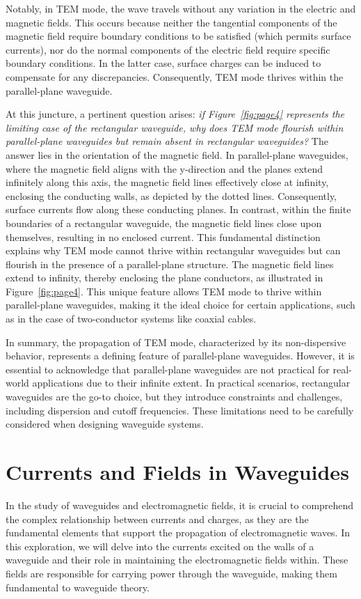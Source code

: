 Notably, in TEM mode, the wave travels without any variation in the electric and magnetic fields. This occurs because neither the tangential components of the magnetic field require boundary conditions to be satisfied (which permits surface currents), nor do the normal components of the electric field require specific boundary conditions. In the latter case, surface charges can be induced to compensate for any discrepancies. Consequently, TEM mode thrives within the parallel-plane waveguide.

At this juncture, a pertinent question arises: \emph{if Figure~\ref{fig:page4} represents the limiting case of the rectangular waveguide, why does TEM mode flourish within parallel-plane waveguides but remain absent in rectangular waveguides?} The answer lies in the orientation of the magnetic field. In parallel-plane waveguides, where the magnetic field aligns with the y-direction and the planes extend infinitely along this axis, the magnetic field lines effectively close at infinity, enclosing the conducting walls, as depicted by the dotted lines. Consequently, surface currents flow along these conducting planes. In contrast, within the finite boundaries of a rectangular waveguide, the magnetic field lines close upon themselves, resulting in no enclosed current. This fundamental distinction explains why TEM mode cannot thrive within rectangular waveguides but can flourish in the presence of a parallel-plane structure. The magnetic field lines extend to infinity, thereby enclosing the plane conductors, as illustrated in Figure~\ref{fig:page4}. This unique feature allows TEM mode to thrive within parallel-plane waveguides, making it the ideal choice for certain applications, such as in the case of two-conductor systems like coaxial cables.

In summary, the propagation of TEM mode, characterized by its non-dispersive behavior, represents a defining feature of parallel-plane waveguides. However, it is essential to acknowledge that parallel-plane waveguides are not practical for real-world applications due to their infinite extent. In practical scenarios, rectangular waveguides are the go-to choice, but they introduce constraints and challenges, including dispersion and cutoff frequencies. These limitations need to be carefully considered when designing waveguide systems.


\section{Currents and Fields in Waveguides}
In the study of waveguides and electromagnetic fields, it is crucial to comprehend the complex relationship between currents and charges, as they are the fundamental elements that support the propagation of electromagnetic waves. In this exploration, we will delve into the currents excited on the walls of a waveguide and their role in maintaining the electromagnetic fields within. These fields are responsible for carrying power through the waveguide, making them fundamental to waveguide theory.

